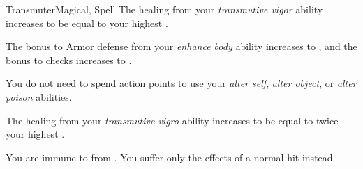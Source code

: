 \begin{feat}{Transmuter}{Magical, Spell}
         The healing from your \textit{transmutive vigor} ability increases to be equal to your highest .

         The bonus to Armor defense from your \textit{enhance body} ability increases to , and the bonus to checks increases to .

         You do not need to spend action points to use your \textit{alter self}, \textit{alter object}, or \textit{alter poison} abilities.

         The healing from your \textit{transmutive vigro} ability increases to be equal to twice your highest .

         You are immune to  from .
        You suffer only the effects of a normal hit instead.
    \end{feat}

